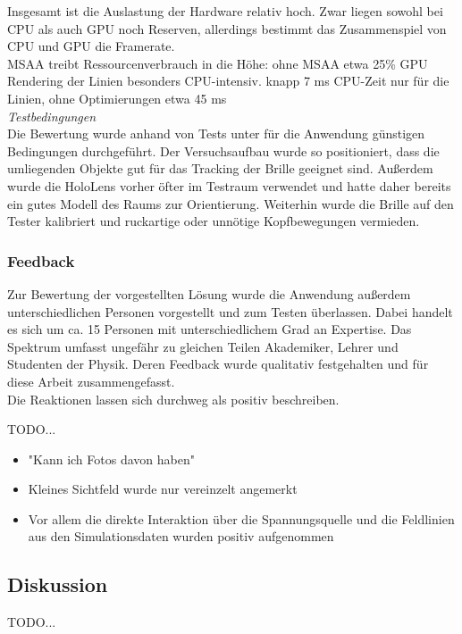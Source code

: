 Insgesamt ist die Auslastung der Hardware relativ hoch. Zwar liegen sowohl bei CPU als auch GPU noch Reserven, allerdings bestimmt das Zusammenspiel von CPU und GPU die Framerate.\\

MSAA treibt Ressourcenverbrauch in die Höhe: ohne MSAA etwa 25\% GPU\\
Rendering der Linien besonders CPU-intensiv. knapp 7 ms CPU-Zeit nur für die Linien, ohne Optimierungen etwa 45 ms\\

\textit{Testbedingungen}\\
Die Bewertung wurde anhand von Tests unter für die Anwendung günstigen Bedingungen durchgeführt. Der Versuchsaufbau wurde so positioniert, dass die umliegenden Objekte gut für das Tracking der Brille geeignet sind. Außerdem wurde die HoloLens vorher öfter im Testraum verwendet und hatte daher bereits ein gutes Modell des Raums zur Orientierung. Weiterhin wurde die Brille auf den Tester kalibriert und ruckartige oder unnötige Kopfbewegungen vermieden. 

\subsubsection{Feedback}
Zur Bewertung der vorgestellten Lösung wurde die Anwendung außerdem unterschiedlichen Personen vorgestellt und zum Testen überlassen. Dabei handelt es sich um ca. 15 Personen mit unterschiedlichem Grad an Expertise. Das Spektrum umfasst ungefähr zu gleichen Teilen Akademiker, Lehrer und Studenten der Physik. Deren Feedback wurde qualitativ festgehalten und für diese Arbeit zusammengefasst.\\

Die Reaktionen lassen sich durchweg als positiv beschreiben.

TODO...

\begin{itemize}
	\item "Kann ich Fotos davon haben"
	\item Kleines Sichtfeld wurde nur vereinzelt angemerkt
	\item Vor allem die direkte Interaktion über die Spannungsquelle und die Feldlinien aus den Simulationsdaten wurden positiv aufgenommen
\end{itemize}


\subsection{Diskussion}
TODO...

